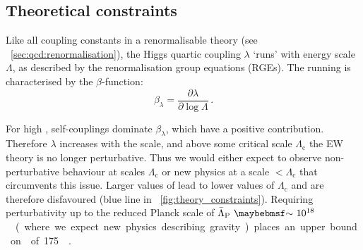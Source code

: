 


\subsection{Theoretical constraints}
\label{sec:prior_constraints:theory}

Like all coupling constants in a renormalisable theory (see 
\Section~\ref{sec:qcd:renormalisation}), the Higgs quartic coupling $\lambda$ `runs' with 
energy scale $\Lambda$, as described by the renormalisation group equations (RGEs). The 
running is characterised by the $\beta$-function:
\begin{equation*}
	\beta_{\lambda} = \frac{\partial \lambda}{\partial \log\Lambda} \,.
\end{equation*}

For high \mH, self-couplings dominate $\beta_{\lambda}$, which have a
positive contribution. Therefore $\lambda$ increases with the scale, and above some 
critical scale $\Lambda_{\text{c}}$ the EW theory is no longer perturbative. Thus we 
would either expect to observe non-perturbative behaviour at scales 
\about$\Lambda_{\text{c}}$ or new physics at a scale $<\Lambda_{\text{c}}$ that 
circumvents this issue. Larger values of \mH lead to lower values of $\Lambda_{\text{c}}$ 
and are therefore disfavoured (blue line in \Figure~\ref{fig:theory_constraints}). 
Requiring perturbativity up to the reduced Planck scale of 
\unit{$\bar{\Lambda}_{\text{P}}~\about~10^{18}$}{\GeV} (where we expect new physics 
describing gravity) places an upper bound on \mH of \unit{175}{\GeV} \cite{Ellis:2009}.

